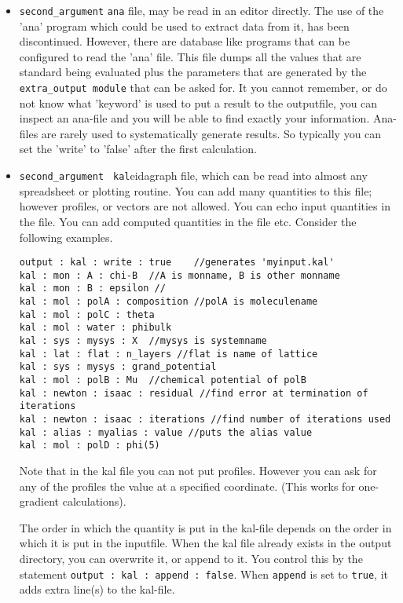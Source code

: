 \documentclass{article}
\begin{document}
\begin{itemize} 
\item{\tt second\_argument} {\tt ana} file, may be read in an editor directly. The use of the 'ana' program which could be used to extract data from it, has been discontinued. However, there are database like programs that can be configured to read the 'ana' file. This file dumps all the values that are standard being evaluated plus the parameters that are generated by the {\tt extra\_output module} that can be asked for. It you cannot remember, or do not know what 'keyword' is used to put a result to the outputfile, you can inspect an ana-file and you will be able to find exactly your information. Ana-files are rarely used to systematically generate results. So typically you can set the 'write' to 'false' after the first calculation. 

\item {\tt second\_argument } {\tt kal}eidagraph file, which can be read into almost any spreadsheet or plotting routine. You can add many quantities to this file; however profiles, or vectors are not allowed. You can echo input quantities in the file. You can add computed quantities in the file etc. Consider the following examples.
\begin{verbatim}
output : kal : write : true    //generates 'myinput.kal'
kal : mon : A : chi-B  //A is monname, B is other monname
kal : mon : B : epsilon //
kal : mol : polA : composition //polA is moleculename
kal : mol : polC : theta
kal : mol : water : phibulk
kal : sys : mysys : X  //mysys is systemname 
kal : lat : flat : n_layers //flat is name of lattice
kal : sys : mysys : grand_potential
kal : mol : polB : Mu  //chemical potential of polB 
kal : newton : isaac : residual //find error at termination of iterations
kal : newton : isaac : iterations //find number of iterations used
kal : alias : myalias : value //puts the alias value 
kal : mol : polD : phi(5) 

\end{verbatim}
Note that in the kal file you can not put profiles. However you can ask for any of the profiles the value at a specified coordinate. (This works for one-gradient calculations).

The order in which the quantity is put in the kal-file depends on the order in which it is put in the inputfile. When the kal file already exists in the output directory, you can overwrite it, or append to it. You control this by the statement {\tt output : kal : append : false}. When {\tt append} is set to {\tt true}, it adds extra line(s) to the kal-file.   


\end{itemize}
\end{document}
